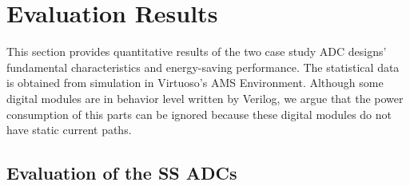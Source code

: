 \documentclass[conference]{IEEEtran}
\begin{document}
\section{Evaluation Results}\label{result}

This section provides quantitative results of the two case study ADC designs’ fundamental characteristics and energy-saving performance. The statistical data is obtained from simulation in Virtuoso’s AMS Environment. Although some digital modules are in behavior level written by Verilog, we argue that the power consumption of this parts  can be ignored because these digital modules do not have static current paths.

\subsection{Evaluation of the SS ADCs}
\end{document}
